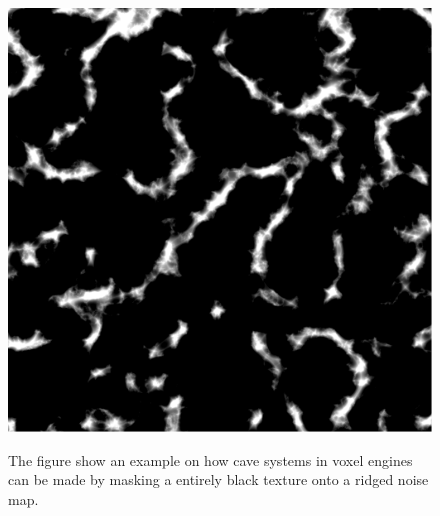 \begin{figure}[H]
\begin{minipage}[b]{.32\linewidth}
		\label{fig:6b}
	\end{minipage}
	\begin{minipage}[b]{.32\linewidth}
		\includegraphics[width=0.95\linewidth]{img/Caves}
		\label{fig:6c}
	\end{minipage}
	\centering
	\caption{The figure show an example on how cave systems in voxel engines can be made by masking a entirely black texture onto a ridged noise map.}
	\label{fig:Caves}
\end{figure}